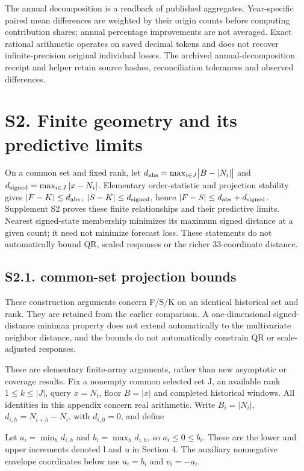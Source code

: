 \documentclass[11pt,a4paper]{article}
\begin{document}
The annual decomposition is a readback of published aggregates. Year-specific paired mean differences are weighted by their origin counts before computing contribution shares; annual percentage improvements are not averaged. Exact rational arithmetic operates on saved decimal tokens and does not recover infinite-precision original individual losses. The archived annual-decomposition receipt and helper retain source hashes, reconciliation tolerances and observed differences.

\section*{S2. Finite geometry and its predictive limits}
On a common set and fixed rank, let \(d_{\rm abs}=\max_{i\in J}\bigl|B-|N_i|\bigr|\) and \(d_{\rm signed}=\max_{i\in J}|x-N_i|\). Elementary order-statistic and projection stability gives \(|F-K|\le d_{\rm abs}\), \(|S-K|\le d_{\rm signed}\), hence \(|F-S|\le d_{\rm abs}+d_{\rm signed}\). Supplement S2 proves these finite relationships and their predictive limits. Nearest signed-state membership minimizes its maximum signed distance at a given count; it need not minimize forecast loss. These statements do not automatically bound QR, scaled responses or the richer 33-coordinate distance.

\subsection*{S2.1. common-set projection bounds}
These construction arguments concern F/S/K on an identical historical set and rank. They are retained from the earlier comparison. A one-dimensional signed-distance minimax property does not extend automatically to the multivariate neighbor distance, and the bounds do not automatically constrain QR or scale-adjusted responses.

These are elementary finite-array arguments, rather than new asymptotic or coverage results. Fix a nonempty common selected set J, an available rank \(1\le k\le|J|\), query \(x=N_t\), floor \(B=|x|\) and completed historical windows. All identities in this appendix concern real arithmetic. Write \(B_i=|N_i|\), \(d_{i,h}=N_{i+h}-N_i\), with \(d_{i,0}=0\), and define

Let \(a_i=\min_h d_{i,h}\) and \(b_i=\max_h d_{i,h}\), so \(a_i\le0\le b_i\). These are the lower and upper increments denoted l and u in Section 4. The auxiliary nonnegative envelope coordinates below use \(u_i=b_i\) and \(v_i=-a_i\).
\end{document}
